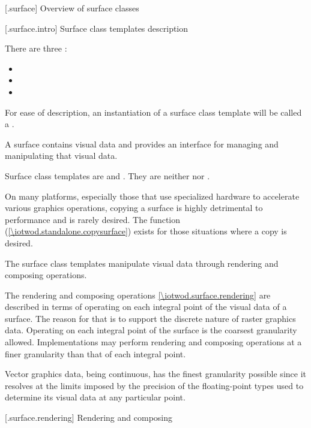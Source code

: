  [\iotwod.surface] {Overview of surface classes}

 [\iotwod.surface.intro] {Surface class templates description}

\pnum
{}%
There are three :
\begin{itemize}
\item {}
\item {}
\item {}
\end{itemize}

\pnum
For ease of description, an instantiation of a surface class template will be called a .

\pnum
A surface contains visual data and provides an interface for managing and manipulating that visual data.

\pnum
Surface class templates are  and . They are neither  nor . \begin{note}
On many platforms, especially those that use specialized hardware to accelerate various graphics operations, copying a surface is highly detrimental to performance and is rarely desired. The  function (\ref{\iotwod.standalone.copysurface}) exists for those situations where a copy is desired.
\end{note}

\pnum
The surface class templates manipulate visual data through rendering and composing operations.

\pnum
The rendering and composing operations \ref{\iotwod.surface.rendering} are described in terms of operating on each integral point of the visual data of a surface. The reason for that is to support the discrete nature of raster graphics data. Operating on each integral point of the surface is the coarsest granularity allowed. Implementations may perform rendering and composing operations at a finer granularity than that of each integral point.
\begin{note}
Vector graphics data, being continuous, has the finest granularity possible since it resolves at the limits imposed by the precision of the floating-point types used to determine its visual data at any particular point.
\end{note} 

 [\iotwod.surface.rendering] {Rendering and composing}

